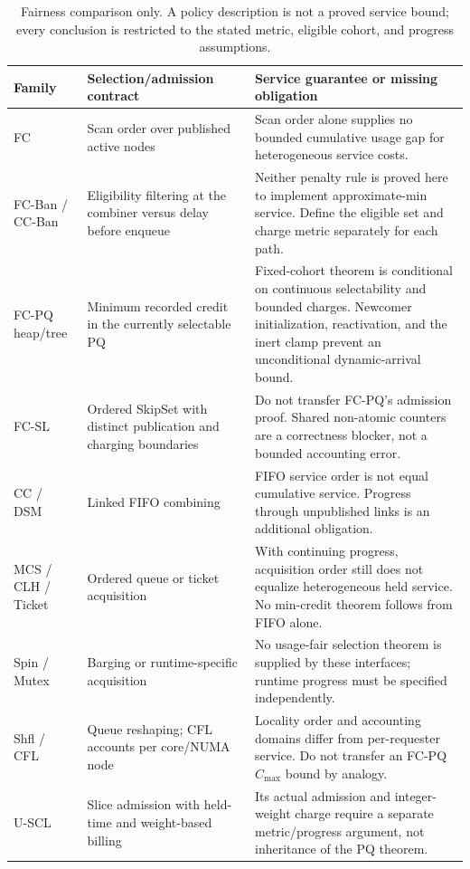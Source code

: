 \begin{table}[t]
\centering\small
\caption{Fairness comparison only. A policy description is not a proved
service bound; every conclusion is restricted to the stated metric,
eligible cohort, and progress assumptions.}
\label{tab:fairness}
\begin{tabular}{@{}P{0.14\textwidth}P{0.33\textwidth}P{0.47\textwidth}@{}}
\toprule
Family & Selection/admission contract & Service guarantee or missing obligation \\
\midrule
FC & Scan order over published active nodes & Scan order alone supplies no bounded cumulative usage gap for heterogeneous service costs. \\
FC-Ban / CC-Ban & Eligibility filtering at the combiner versus delay before enqueue & Neither penalty rule is proved here to implement approximate-min service. Define the eligible set and charge metric separately for each path. \\
FC-PQ heap/tree & Minimum recorded credit in the currently selectable PQ & Fixed-cohort theorem is conditional on continuous selectability and bounded charges. Newcomer initialization, reactivation, and the inert clamp prevent an unconditional dynamic-arrival bound. \\
FC-SL & Ordered SkipSet with distinct publication and charging boundaries & Do not transfer FC-PQ's admission proof. Shared non-atomic counters are a correctness blocker, not a bounded accounting error. \\
CC / DSM & Linked FIFO combining & FIFO service order is not equal cumulative service. Progress through unpublished links is an additional obligation. \\
MCS / CLH / Ticket & Ordered queue or ticket acquisition & With continuing progress, acquisition order still does not equalize heterogeneous held service. No min-credit theorem follows from FIFO alone. \\
Spin / Mutex & Barging or runtime-specific acquisition & No usage-fair selection theorem is supplied by these interfaces; runtime progress must be specified independently. \\
Shfl / CFL & Queue reshaping; CFL accounts per core/NUMA node & Locality order and accounting domains differ from per-requester service. Do not transfer an FC-PQ $C_{\max}$ bound by analogy. \\
U-SCL & Slice admission with held-time and weight-based billing & Its actual admission and integer-weight charge require a separate metric/progress argument, not inheritance of the PQ theorem. \\
\bottomrule
\end{tabular}
\end{table}

